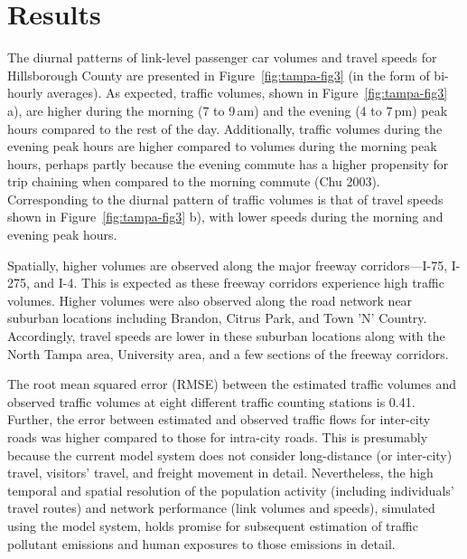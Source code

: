\section{Results}
The diurnal patterns of link-level passenger car volumes and travel speeds for Hillsborough County are presented in Figure~\ref{fig:tampa-fig3} (in the form of bi-hourly averages). As expected, traffic volumes, shown in Figure~\ref{fig:tampa-fig3} a), are higher during the morning (7 to 9\,am) and the evening (4 to 7\,pm) peak hours compared to the rest of the day. Additionally, traffic volumes during the evening peak hours are higher compared to volumes during the morning peak hours, perhaps partly because the evening commute has a higher propensity for trip chaining when compared to the morning commute \citep[][]{}(Chu 2003). Corresponding to the diurnal pattern of traffic volumes is that of travel speeds shown in Figure~\ref{fig:tampa-fig3} b), with lower speeds during the morning and evening peak hours.

Spatially, higher volumes are observed along the major freeway corridors---I-75, I-275, and I-4. This is expected as these freeway corridors experience high traffic volumes. Higher volumes were also observed along the road network near suburban locations including Brandon, Citrus Park, and Town 'N' Country. Accordingly, travel speeds are lower in these suburban locations along with the North Tampa area, University area, and a few sections of the freeway corridors. 

The root mean squared error (RMSE)  between the estimated traffic volumes and observed traffic volumes at eight different traffic counting stations is 0.41. Further, the error between estimated and observed traffic flows for inter-city roads was higher compared to those for intra-city roads. This is presumably because the current model system does not consider long-distance (or inter-city) travel, visitors' travel, and freight movement in detail. Nevertheless, the high temporal and spatial resolution of the population activity (including individuals' travel routes) and network performance (\ie link volumes and speeds), simulated using the model system, holds promise for subsequent estimation of traffic pollutant emissions and human exposures to those emissions in detail.  

